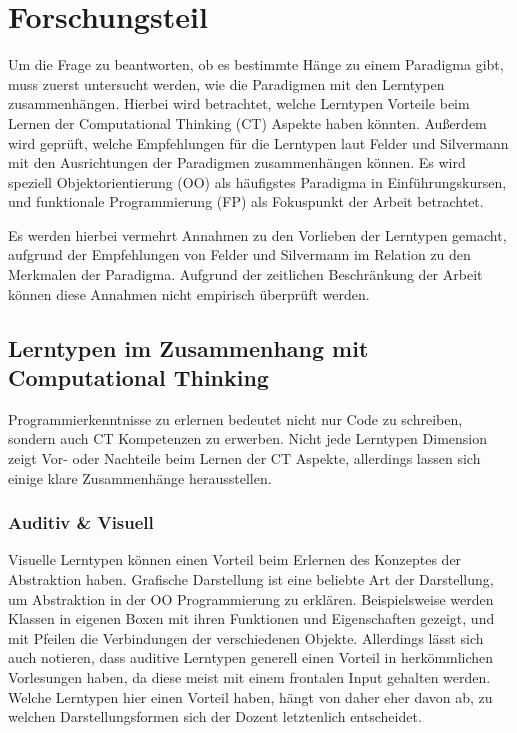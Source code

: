 \clearpage
\section{Forschungsteil}
\label{sec:work}


Um die Frage zu beantworten, ob es bestimmte Hänge zu einem Paradigma gibt, muss zuerst untersucht werden, wie die Paradigmen mit den Lerntypen zusammenhängen.
Hierbei wird betrachtet, welche Lerntypen Vorteile beim Lernen der Computational Thinking (CT) Aspekte haben könnten.
Außerdem wird geprüft, welche Empfehlungen für die Lerntypen laut Felder und Silvermann mit den Ausrichtungen der Paradigmen zusammenhängen können. Es wird speziell Objektorientierung (OO) als häufigstes Paradigma in Einführungskursen, und funktionale Programmierung (FP) als Fokuspunkt der Arbeit betrachtet.

Es werden hierbei vermehrt Annahmen zu den Vorlieben der Lerntypen gemacht, aufgrund der Empfehlungen von Felder und Silvermann im Relation zu den Merkmalen der Paradigma. Aufgrund der zeitlichen Beschränkung der Arbeit können diese Annahmen nicht empirisch überprüft werden.

\subsection{Lerntypen im Zusammenhang mit Computational Thinking}
Programmierkenntnisse zu erlernen bedeutet nicht nur Code zu schreiben, sondern auch CT Kompetenzen zu erwerben.
Nicht jede Lerntypen Dimension zeigt Vor- oder Nachteile beim Lernen der CT Aspekte, allerdings lassen sich einige klare Zusammenhänge herausstellen.

\subsubsection{Auditiv & Visuell}
Visuelle Lerntypen können einen Vorteil beim Erlernen des Konzeptes der Abstraktion haben. Grafische Darstellung ist eine beliebte Art der Darstellung, um Abstraktion in der OO Programmierung zu erklären. Beispielsweise werden Klassen in eigenen Boxen mit ihren Funktionen und Eigenschaften gezeigt, und mit Pfeilen die Verbindungen der verschiedenen Objekte.
Allerdings lässt sich auch notieren, dass auditive Lerntypen generell einen Vorteil in herkömmlichen Vorlesungen haben, da diese meist mit einem frontalen Input gehalten werden. Welche Lerntypen hier einen Vorteil haben, hängt von daher eher davon ab, zu welchen Darstellungsformen sich der Dozent letztenlich entscheidet. %

